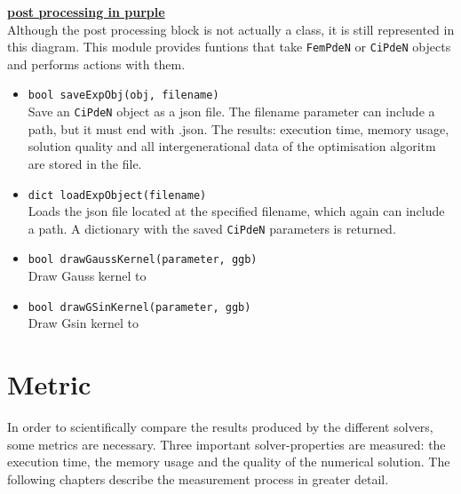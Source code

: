 \documentclass[./\jobname.tex]{subfiles}
\begin{document}
\textcolor{post_proc_colour}{\large \underline{\textbf{post processing in purple}}} \\
Although the post processing block is not actually a class, it is still represented in this diagram. This module provides funtions that take \colorbox{light-gray}{\lstinline[basicstyle=\ttfamily\color{black}]|FemPdeN|} or \colorbox{light-gray}{\lstinline[basicstyle=\ttfamily\color{black}]|CiPdeN|} objects and performs actions with them. 

\begin{itemize}
	\item \colorbox{light-gray}{\lstinline[basicstyle=\ttfamily\color{black}]|bool saveExpObj(obj, filename)|} \\
	Save an \colorbox{light-gray}{\lstinline[basicstyle=\ttfamily\color{black}]|CiPdeN|} object as a \gls{json} file. The filename parameter can include a path, but it must end with .json. The results: execution time, memory usage, solution quality and all intergenerational data of the optimisation algoritm are stored in the file. 
	\item \colorbox{light-gray}{\lstinline[basicstyle=\ttfamily\color{black}]|dict loadExpObject(filename)|} \\
	Loads the \gls{json} file located at the specified filename, which again can include a path. A dictionary with the saved \colorbox{light-gray}{\lstinline[basicstyle=\ttfamily\color{black}]|CiPdeN|} parameters is returned. 
	\item \colorbox{light-gray}{\lstinline[basicstyle=\ttfamily\color{black}]|bool drawGaussKernel(parameter, ggb)|} \\
	Draw Gauss kernel to 
	\item \colorbox{light-gray}{\lstinline[basicstyle=\ttfamily\color{black}]|bool drawGSinKernel(parameter, ggb)|} \\
	Draw Gsin kernel to
\end{itemize}

\section{Metric} 
\label{chap:metric}
In order to scientifically compare the results produced by the different solvers, some metrics are necessary. Three important solver-properties are measured: the execution time, the memory usage and the quality of the numerical solution. The following chapters describe the measurement process in greater detail. 
\end{document}
